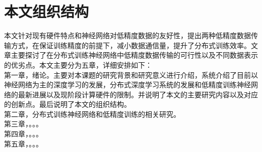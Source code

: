 \section{本文组织结构}
本文针对现有硬件特点和神经网络对低精度数据的友好性，提出两种低精度数据传输方式，在保证训练精度的前提下，减小数据通信量，提升了分布式训练效率。文章主要探讨了在分布式训练神经网络中低精度数据传输的可行性以及不同数据表示的优劣点。本文主要分为五章，详细安排如下：\\
第一章，绪论。主要对本课题的研究背景和研究意义进行介绍，系统介绍了目前以神经网络为主的深度学习的发展，分布式深度学习系统的发展和低精度训练神经网络的最新进展以及现阶段计算硬件的限制。并说明了本文的主要研究内容以及对应的创新点。最后说明了本文的组织结构。\\
第二章，分布式训练神经网络和低精度训练的相关研究。\\
第三章，。。。\\
第四章，。。。\\
第五章，。。。\\








